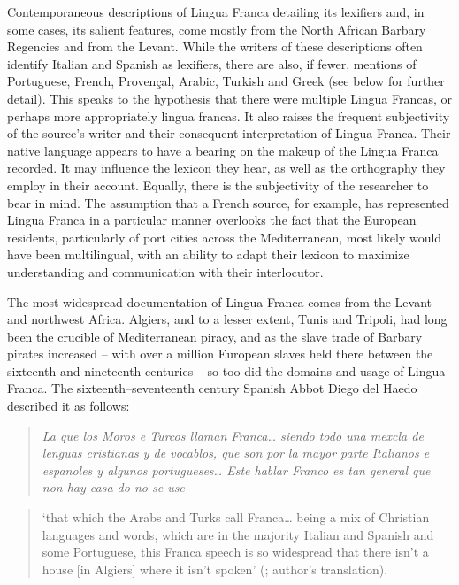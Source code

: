 \documentclass[output=paper]{langsci/langscibook}
\begin{document}
	Contemporaneous descriptions of Lingua Franca detailing its lexifiers and, in some cases, its salient features, come mostly from the North African Barbary Regencies and from the Levant. While the writers of these descriptions often identify Italian and Spanish as lexifiers, there are also, if fewer, mentions of Portuguese, French, Provençal, Arabic, Turkish and Greek (see below for further detail). This speaks to the hypothesis that there were multiple Lingua Francas, or perhaps more appropriately lingua francas. It also raises the frequent subjectivity of the source’s writer and their consequent interpretation of Lingua Franca. Their native language appears to have a bearing on the makeup of the Lingua Franca recorded. It may influence the lexicon they hear, as well as the orthography they employ in their account. Equally, there is the subjectivity of the researcher to bear in mind. The assumption that a French source, for example, has represented Lingua Franca in a particular manner overlooks the fact that the European residents, particularly of port cities across the Mediterranean, most likely would have been multilingual, with an ability to adapt their lexicon to maximize understanding and communication with their interlocutor. 
	
	The most widespread documentation of Lingua Franca comes from the Levant and northwest Africa. Algiers, and to a lesser extent, Tunis and Tripoli, had long been the crucible of Mediterranean piracy, and as the slave trade of Barbary pirates increased – with over a million European slaves held there between the sixteenth and nineteenth centuries \citep[23]{Davis2004} – so too did the domains and usage of Lingua Franca. The sixteenth–seventeenth century Spanish Abbot Diego del Haedo described it as follows: 
	
	\begin{quote}
	\textit{La que los Moros e Turcos llaman Franca… siendo todo una mexcla de lenguas cristianas y de vocablos, que son por la mayor parte Italianos e espanoles y algunos portugueses… Este hablar Franco es tan general que non hay casa do no se use}
	\end{quote}
	
	\begin{quote}
	‘that which the Arabs and Turks call Franca… being a mix of Christian languages and words, which are in the majority Italian and Spanish and some Portuguese, this Franca speech is so widespread that there isn’t a house [in Algiers] where it isn’t spoken’  (\citealt[24]{Haedo1612}; author’s translation).
	\end{quote}
	
\end{document}
